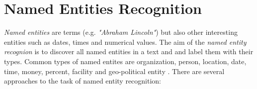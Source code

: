 \documentclass[a4paper, 12pt, twoside]{fithesis2}		%
\renewcommand{\_}{\leavevmode \kern0.07em\vbox{\hrule width0.4em}}
\begin{document}




\section{Named Entities Recognition}
\label{sec:terms-extraction}
\textit{Named entities} are terms (e.g. \textit{"Abraham Lincoln"})
but also other interesting entities such as dates, times and numerical values.
The aim of the \textit{named entity recognion} is to discover all named entities in a text and and label them with their types. Common types of named entites are organization, person, location, date, time, money, percent, facility and geo-political entity \cite[][281]{nlp-python}. There are several approaches to the task of named entity recognition:
\end{document}
